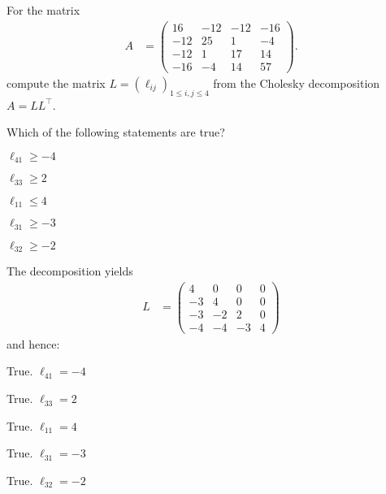 

\begin{question}
For the matrix
\begin{eqnarray*}
  A &= \left( \begin{array}{rrrr}  16 & -12 & -12 & -16 \\ -12 &  25 &   1 &  -4 \\ -12 &   1 &  17 &  14 \\ -16 &  -4 &  14 &  57 \end{array} \right).
\end{eqnarray*}
compute the matrix $L = (\ell_{ij})_{1 \leq i,j \leq 4}$ from the
Cholesky decomposition $ A = L L^\top$.

Which of the following statements are true?
\begin{answerlist}
  \item $\ell_{41} \ge -4$
  \item $\ell_{33} \ge 2$
  \item $\ell_{11} \le 4$
  \item $\ell_{31} \ge -3$
  \item $\ell_{32} \ge -2$
\end{answerlist}
\end{question}

\begin{solution}
The decomposition yields
\begin{eqnarray*}
  L &= \left( \begin{array}{rrrr}  4 &  0 &  0 &  0 \\ -3 &  4 &  0 &  0 \\ -3 & -2 &  2 &  0 \\ -4 & -4 & -3 &  4 \end{array} \right)
\end{eqnarray*}
and hence:
\begin{answerlist}
  \item True. $\ell_{41} = -4$
  \item True. $\ell_{33} = 2$
  \item True. $\ell_{11} = 4$
  \item True. $\ell_{31} = -3$
  \item True. $\ell_{32} = -2$
\end{answerlist}
\end{solution}

